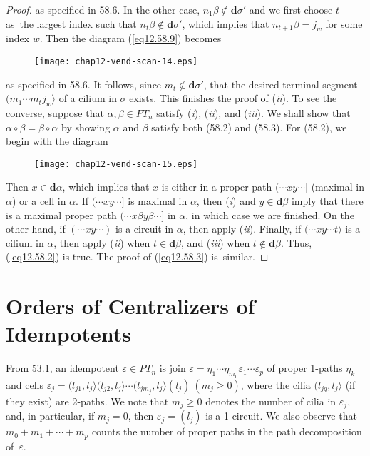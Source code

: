 \documentclass{surv-l}
\numberwithin{equation}{section}
\numberwithin{table}{section}
\numberwithin{figure}{section}
\theoremstyle{plain}
\theoremstyle{definition}
\begin{document}
\begin{proof}
\noindent as specified in 58.6. In the other case, $n_{1}\beta\not\in
\mathbf{d}\sigma'$ and we first choose $t$ as~the largest index
such that $n_{t}\beta\not\in \mathbf{d}\sigma'$, which implies
that $n_{t+1}\beta=j_{w}$ for some index $w$. Then the diagram
(\ref{eq12.58.9}) becomes
\begin{figure}[!h]
\texttt{[image: chap12-vend-scan-14.eps]}
\end{figure}

\noindent as specified in 58.6. It follows, since $m_{t}\not\in
\mathbf{d}\sigma'$, that the desired terminal segment
$(m_{1}\cdots m_{t}j_{w}\rangle$ of a cilium in $\sigma$ exists.
This finishes the proof of (\emph{ii}). To see the converse,
suppose that $\alpha,\beta\in PT_{n}$ satisfy (\emph{i}), (\emph{ii}),
and (\emph{iii}). We shall show that $\alpha \circ\beta=\beta
\circ\alpha$ by showing $\alpha$ and $\beta$ satisfy both (58.2)
and (58.3). For (58.2), we begin with the diagram
\begin{figure}[!h]
\texttt{[image: chap12-vend-scan-15.eps]}
\end{figure}

\noindent Then $x\in \mathbf{d}\alpha$, which implies that $x$ is either in
a proper path $(\cdots xy\cdots]$ (maximal in $\alpha$) or a cell
in $\alpha$. If $(\cdots xy\cdots]$ is maximal in $\alpha$, then
(\emph{i}) and $ y\in \mathbf{d}\beta$ imply that there is a maximal
proper path $(\cdots x\beta y\beta\cdots]$ in $\alpha$, in which case
we are finished. On the other hand, if $(\cdots xy\cdots)$ is a
circuit in $\alpha$, then apply (\emph{ii}). Finally, if $(\cdots
xy\cdots t\rangle$ is a cilium in $\alpha$, then apply (\emph{ii})
when $ t\in \mathbf{d}\beta$, and (\emph{iii}) when $ t\not\in
\mathbf{d}\beta$. Thus, (\ref{eq12.58.2}) is true. The proof of
(\ref{eq12.58.3}) is~similar.
\end{proof}

\section{Orders of Centralizers of Idempotents}\label{sec12.59}

From 53.1, an idempotent $\varepsilon \in PT_{n}$ is join
$\varepsilon=\eta_{1}\cdots\eta_{m_{0}}\varepsilon_{1}\cdots\varepsilon_{p}$
of proper 1-paths $\eta_{k}$ and cells $\varepsilon_{j}=(l_{j1},
l_{j}\rangle(l_{j2}, l_{j}\rangle\cdots(l_{jm_{j}},
l_{j}\rangle(l_{j})\ (m_{j}\geq 0)$, where the cilia $(l_{jq},
l_{j}\rangle$ (if they exist) are 2-paths. We note that $m_{j}\geq
0$ denotes the number of cilia in $\varepsilon_{j}$, and, in
particular, if $m_{j}=0$, then $\varepsilon_{j}=(l_{j})$ is a
1-circuit. We also observe that $m_{0}+m_{1}+\cdots+m_{p}$ counts
the number of proper paths in the path decomposition
of~$\varepsilon$.
\end{document}
